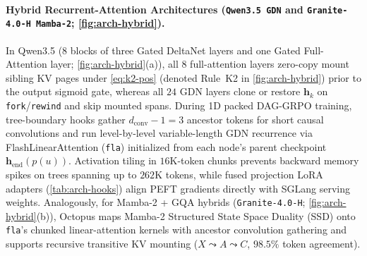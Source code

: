 \documentclass{article}
\begin{document}
\paragraph{Hybrid Recurrent-Attention Architectures (\texttt{Qwen3.5 GDN} and \texttt{Granite-4.0-H Mamba-2}; \cref{fig:arch-hybrid}).}
In Qwen3.5 ($8$ blocks of three Gated DeltaNet layers and one Gated Full-Attention layer; \cref{fig:arch-hybrid}(a)), all $8$ full-attention layers zero-copy mount sibling KV pages under \cref{eq:k2-pos} (denoted Rule~K2 in \cref{fig:arch-hybrid}) prior to the output sigmoid gate, whereas all $24$ GDN layers clone or restore $\mathbf{h}_k$ on \texttt{fork}/\texttt{rewind} and skip mounted spans. During 1D packed DAG-GRPO training, tree-boundary hooks gather $d_{\text{conv}} - 1 = 3$ ancestor tokens for short causal convolutions and run level-by-level variable-length GDN recurrence via FlashLinearAttention (\texttt{fla}) initialized from each node's parent checkpoint $\mathbf{h}_{\text{end}}(p(u))$. Activation tiling in $16\text{K}$-token chunks prevents backward memory spikes on trees spanning up to $262\text{K}$ tokens, while fused projection LoRA adapters (\cref{tab:arch-hooks}) align PEFT gradients directly with SGLang serving weights. Analogously, for Mamba-2 + GQA hybrids (\texttt{Granite-4.0-H}; \cref{fig:arch-hybrid}(b)), Octopus maps Mamba-2 Structured State Space Duality (SSD) onto \texttt{fla}'s chunked linear-attention kernels with ancestor convolution gathering and supports recursive transitive KV mounting ($X \leadsto A \leadsto C$, $98.5\%$ token agreement).
\end{document}
